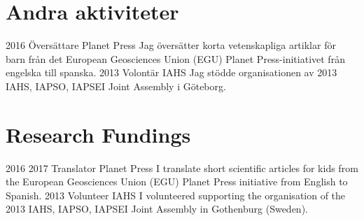 \ifswedish
  \section{Andra aktiviteter}
      \position
          {2016 \textemdash{}}
          {Översättare}
          {Planet Press}
          {Jag översätter korta vetenskapliga artiklar för barn från det European Geosciences Union (EGU) Planet Press-initiativet från engelska till spanska.}
      \position
          {2013}
          {Volontär}
          {IAHS}
          {Jag stödde organisationen av 2013 IAHS, IAPSO, IAPSEI Joint Assembly i Göteborg.}
\else
  \section{Research Fundings}
      \position
          {2016 \textemdash{} 2017}
          {Translator}
          {Planet Press}
          {I translate short scientific articles for kids from the European Geosciences Union (EGU) Planet Press initiative from English to Spanish.}
      \position
          {2013}
          {Volunteer}
          {IAHS}
          {I volunteered supporting the organisation of the 2013 IAHS, IAPSO, IAPSEI Joint Assembly in Gothenburg (Sweden).}
\fi
